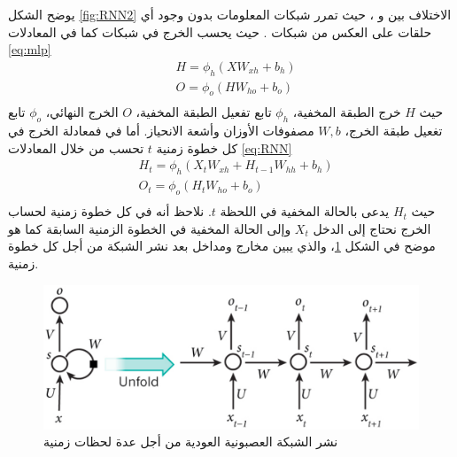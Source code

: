 يوضح الشكل
\ref{fig:RNN2}
 الاختلاف بين
 و
،
 حيث تمرر شبكات 
المعلومات بدون وجود أي حلقات على العكس من شبكات
.
حيث يحسب الخرج في شبكات
 كما في المعادلات
\ref{eq:mlp}
\begin{equation}
	\begin{split}
	& H = \phi_h (XW_{xh} + b_h)\\
	& O = \phi_o (HW_{ho} + b_o)\\
	\end{split}
	\label{eq:mlp}
\end{equation}
حيث $H$ خرج الطبقة المخفية، 
$\phi_h$
تابع تفعيل الطبقة المخفية،
$O$
الخرج النهائي،
$\phi_o$
تابع تغعيل طبقة الخرج، 
$W,b$
مصفوفات الأوزان وأشعة الانحياز.
\newline
أما في 
فمعادلة الخرج في كل خطوة زمنية
$t$
تحسب من خلال المعادلات 
\ref{eq:RNN}
\begin{equation}
\begin{split}
	&H_t = \phi_h(X_t W_{xh} + H_{t-1} W_{hh} + b_h)\\
	& O_t = \phi_o (H_t W_{ho} + b_o)\\
\end{split}
\label{eq:RNN}
\end{equation}
حيث
$H_t$
يدعى بالحالة المخفية
في اللحظة
$t$.
\newline
نلاحظ أنه في كل خطوة زمنية لحساب الخرج نحتاج إلى الدخل
$X_t$
وإلى الحالة المخفية في الخطوة الزمنية السابقة كما هو موضح في الشكل 
\ref{fig:RNN3}،
والذي يبين مخارج ومداخل
بعد نشر الشبكة من أجل كل خطوة زمنية.
\begin{figure}[h!]
	\centerline{\includegraphics[width=\textwidth]{images/RNN_unfold}}
	\caption{
		نشر الشبكة العصبونية العودية
		من أجل عدة لحظات زمنية
		}
	\label{fig:RNN3}
\end{figure}
\newline
